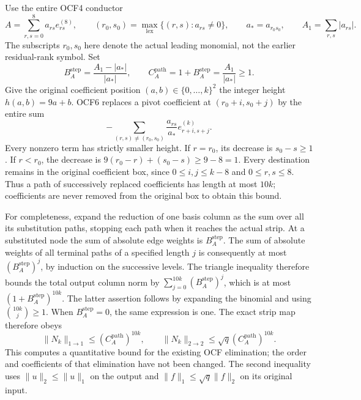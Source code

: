 \documentclass[11pt]{article}
\begin{document}
Use the entire OCF4 conductor \[
A=\sum_{r,s=0}^{8}a_{rs}e_{rs}^{(8)},\qquad
(r_0,s_0)=\max_{\mathrm{lex}}\{(r,s):a_{rs}\ne0\},\qquad
a_*=a_{r_0s_0},\qquad A_1=\sum_{r,s}|a_{rs}|.
\tag{CGS1}
\] The subscripts \(r_0,s_0\) here denote the actual leading monomial, not the earlier residual-rank symbol. Set \[
B_A^{\mathrm{step}}=\frac{A_1-|a_*|}{|a_*|},\qquad
C_A^{\mathrm{path}}=1+B_A^{\mathrm{step}}=\frac{A_1}{|a_*|}\ge1.
\tag{CGS2}
\] Give the original coefficient position \((a,b)\in\{0,\ldots,k\}^2\) the integer height \(h(a,b)=9a+b\). OCF6 replaces a pivot coefficient at \((r_0+i,s_0+j)\) by the entire sum \[
-\sum_{(r,s)\ne(r_0,s_0)}\frac{a_{rs}}{a_*}
   e_{r+i,s+j}^{(k)}.
\tag{CGS3}
\] Every nonzero term has strictly smaller height. If \(r=r_0\), its decrease is \(s_0-s\ge1\). If \(r<r_0\), the decrease is \(9(r_0-r)+(s_0-s)\ge9-8=1\). Every destination remains in the original coefficient box, since \(0\le i,j\le k-8\) and \(0\le r,s\le8\). Thus a path of successively replaced coefficients has length at most \(10k\); coefficients are never removed from the original box to obtain this bound.

For completeness, expand the reduction of one basis column as the sum over all its substitution paths, stopping each path when it reaches the actual strip. At a substituted node the sum of absolute edge weights is \(B_A^{\mathrm{step}}\). The sum of absolute weights of all terminal paths of a specified length \(j\) is consequently at most \((B_A^{\mathrm{step}})^j\), by induction on the successive levels. The triangle inequality therefore bounds the total output column norm by \(\sum_{j=0}^{10k}(B_A^{\mathrm{step}})^j\), which is at most \((1+B_A^{\mathrm{step}})^{10k}\). The latter assertion follows by expanding the binomial and using \(\binom{10k}{j}\ge1\). When \(B_A^{\mathrm{step}}=0\), the same expression is one. The exact strip map therefore obeys \[
\boxed{\|N_k\|_{1\to1}\le(C_A^{\mathrm{path}})^{10k},\qquad
\|N_k\|_{2\to2}\le\sqrt q(C_A^{\mathrm{path}})^{10k}.}
\tag{CGS4}
\] This computes a quantitative bound for the existing OCF elimination; the order and coefficients of that elimination have not been changed. The second inequality uses \(\|u\|_2\le\|u\|_1\) on the output and \(\|f\|_1\le\sqrt q\|f\|_2\) on its original input.
\end{document}
